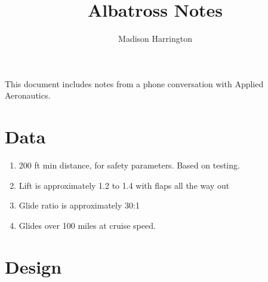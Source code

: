 \documentclass{article}
\begin{document}
\title{Albatross Notes}

\author{Madison Harrington}

\maketitle

This document includes notes from a phone conversation with Applied Aeronautics.

\section{Data}

\begin{enumerate}

\item 200 ft min distance, for safety parameters. Based on testing. \\

\item Lift is approximately 1.2 to 1.4 with flaps all the way out\\

\item Glide ratio is approximately 30:1\\

\item Glides over 100 miles at cruise speed.\\

\end{enumerate}

\section{Design}
\end{document}
